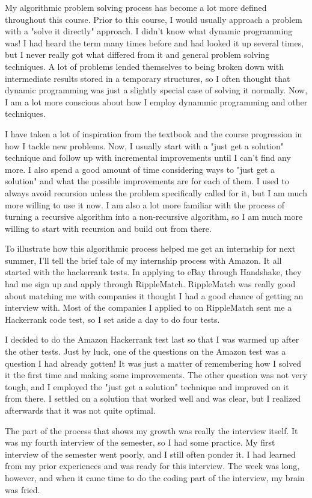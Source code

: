 \documentclass{article}
\begin{document}
My algorithmic problem solving process has become a lot more defined throughout this course. Prior to this course, I would usually approach a problem with a "solve it directly" approach. I didn't know what dynamic programming was! I had heard the term many times before and had looked it up several times, but I never really got what differed from it and general problem solving techniques. A lot of problems lended themselves to being broken down with intermediate results stored in a temporary structures, so I often thought that dynamic programming was just a slightly special case of solving it normally. Now, I am a lot more conscious about how I employ dynammic programming and other techniques.

I have taken a lot of inspiration from the textbook and the course progression in how I tackle new problems. Now, I usually start with a "just get a solution" technique and follow up with incremental improvements until I can't find any more. I also spend a good amount of time considering ways to "just get a solution" and what the possible improvements are for each of them. I used to always avoid recursion unless the problem specifically called for it, but I am much more willing to use it now. I am also a lot more familiar with the process of turning a recursive algorithm into a non-recursive algorithm, so I am much more willing to start with recursion and build out from there.

To illustrate how this algorithmic process helped me get an internship for next summer, I'll tell the brief tale of my internship process with Amazon. It all started with the hackerrank tests. In applying to eBay through Handshake, they had me sign up and apply through RippleMatch. RippleMatch was really good about matching me with companies it thought I had a good chance of getting an interview with. Most of the companies I applied to on RippleMatch sent me a Hackerrank code test, so I set aside a day to do four tests.

I decided to do the Amazon Hackerrank test last so that I was warmed up after the other tests. Just by luck, one of the questions on the Amazon test was a question I had already gotten! It was just a matter of remembering how I solved it the first time and making some improvements. The other question was not very tough, and I employed the "just get a solution" technique and improved on it from there. I settled on a solution that worked well and was clear, but I realized afterwards that it was not quite optimal.

The part of the process that shows my growth was really the interview itself. It was my fourth interview of the semester, so I had some practice. My first interview of the semester went poorly, and I still often ponder it. I had learned from my prior experiences and was ready for this interview. The week was long, however, and when it came time to do the coding part of the interview, my brain was fried.
\end{document}
